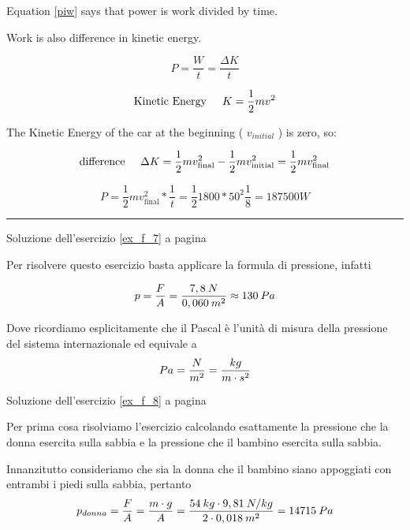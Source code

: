 Equation \ref{piw} says that power is work divided by time.

Work is also difference in kinetic energy.

\begin{equation}
P=\frac{W}{t}=\frac{\Delta K}{t}
\end{equation}

\begin{equation}
\textrm{Kinetic Energy\hspace{0.5cm}} K=\frac{1}{2}mv^2
\end{equation}

The Kinetic Energy of the car at the beginning ( $v_{initial}$ ) is zero, so:

\begin{equation}
\textrm{difference\hspace{0.5cm}}\Delta K=\frac{1}{2}mv_\textrm{final}^2-\frac{1}{2}mv_\textrm{initial}^2=\frac{1}{2}mv_\textrm{final}^2
\end{equation}

\begin{equation}
P=\frac{1}{2}mv_\textrm{final}^2*\frac{1}{t}=
\frac{1}{2}1800*50^2\frac{1}{8}=187500 W
\end{equation}


\vspace{1cm}
\hrule
\vspace{1cm}




Soluzione dell'esercizio \ref{ex_f_7} a pagina \pageref{ex_f_7}\label{sol_f_7}

Per risolvere questo esercizio basta applicare la formula di pressione, infatti

\[p={F\over A}={7,8\: N\over 0,060\: m^2}\approx 130\: Pa\]

Dove ricordiamo esplicitamente che il Pascal è l’unità di misura della pressione del sistema internazionale ed equivale a \[Pa={N\over m^2}={kg\over m\cdot s^2}\]


Soluzione dell'esercizio \ref{ex_f_8} a pagina \pageref{ex_f_8}\label{sol_f_8}

Per prima cosa risolviamo l’esercizio calcolando esattamente la pressione che la donna esercita sulla sabbia e la pressione che il bambino esercita sulla sabbia. 

Innanzitutto consideriamo che sia la donna che il bambino siano appoggiati con entrambi i piedi sulla sabbia, pertanto
\[p_{donna}={F\over A}={m\cdot g\over A}={54\: kg\cdot 9,81\: N/kg\over 2\cdot 0,018\: m^2}=14715\: Pa\]

